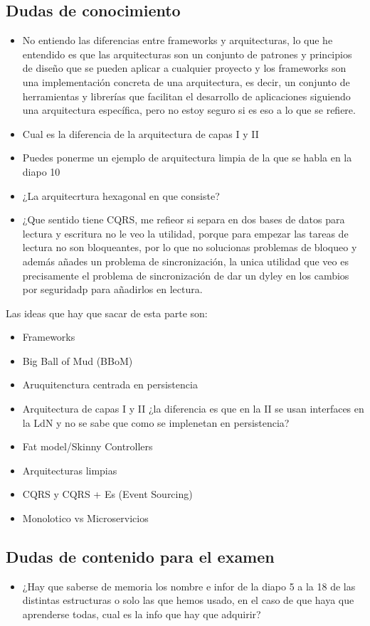 \subsection*{Dudas de conocimiento}
\begin{itemize}
    \item No entiendo las diferencias entre frameworks y arquitecturas, lo que he entendido es que las arquitecturas son un conjunto de patrones y principios de diseño que se pueden aplicar a cualquier proyecto y los frameworks son una implementación concreta de una arquitectura, es decir, un conjunto de herramientas y librerías que facilitan el desarrollo de aplicaciones siguiendo una arquitectura específica, pero no estoy seguro si es eso a lo que se refiere. 
    \item Cual es la diferencia de la arquitectura de capas I y II
    \item Puedes ponerme un ejemplo de arquitectura limpia de la que se habla en la diapo 10
    \item ¿La arquitecrtura hexagonal en que consiste?
    \item ¿Que sentido tiene CQRS, me refieor si separa en dos bases de datos para lectura y escritura no le veo la utilidad, porque para empezar las tareas de lectura no son bloqueantes, por lo que no solucionas problemas de bloqueo y además añades un problema de sincronización, la unica utilidad que veo es precisamente el problema de sincronización de dar un dyley en los cambios por seguridadp para añadirlos en lectura. 
\end{itemize}
Las ideas que hay que sacar de esta parte son:
\begin{itemize}
    \item Frameworks
    \item Big Ball of Mud (BBoM)
    \item Aruquitenctura centrada en persistencia 
    \item Arquitectura de capas I y II ¿la diferencia es que en la II se usan interfaces en la LdN y no se sabe que como se implenetan en persistencia?
    \item Fat model/Skinny Controllers
    \item Arquitecturas limpias
    \item CQRS y CQRS + Es (Event Sourcing)
    \item Monolotico vs Microservicios
\end{itemize}
\subsection*{Dudas de contenido para el examen}
\begin{itemize}
    \item ¿Hay que saberse de memoria los nombre e infor de la diapo 5 a la 18 de las distintas estructuras o solo las que hemos usado, en el caso de que haya que aprenderse todas, cual es la info que hay que adquirir?
\end{itemize}

